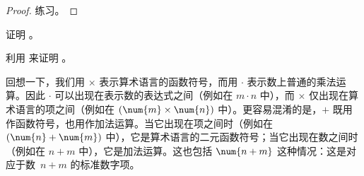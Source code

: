 \documentclass[../../../include/open-logic-section]{subfiles}
\begin{document}
\begin{proof} 练习。\end{proof}

\begin{prob}
证明 。
\end{prob}

\begin{prob}
利用  来证明
。
\end{prob}

\begin{explain}
  回想一下，我们用 $\times$ 表示算术语言的函数符号，而用 $\cdot$ 表示数上普通的乘法运算。因此 $\cdot$ 可以出现在表示数的表达式之间（例如在 $m \cdot n$ 中），而 $\times$ 仅出现在算术语言的项之间（例如在 $(\num{m} \times
  \num{n})$ 中）。更容易混淆的是，$+$ 既用作函数符号，也用作加法运算。当它出现在项之间时（例如在 $(\num{n} + \num{m})$ 中），它是算术语言的二元函数符号；当它出现在数之间时（例如在 $n+m$ 中），它是加法运算。这也包括 $\num{n+m}$ 这种情况：这是对应于数~$n+m$ 的标准数字项。
\end{explain}
\end{document}
